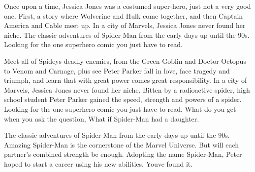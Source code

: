 Once upon a time, Jessica Jones was a costumed super-hero, just not a very good one. First, a story where Wolverine and Hulk come together, and then Captain America and Cable meet up. In a city of Marvels, Jessica Jones never found her niche. The classic adventures of Spider-Man from the early days up until the 90s. Looking for the one superhero comic you just have to read.

Meet all of Spideys deadly enemies, from the Green Goblin and Doctor Octopus to Venom and Carnage, plus see Peter Parker fall in love, face tragedy and triumph, and learn that with great power comes great responsibility. In a city of Marvels, Jessica Jones never found her niche. Bitten by a radioactive spider, high school student Peter Parker gained the speed, strength and powers of a spider. Looking for the one superhero comic you just have to read. What do you get when you ask the question, What if Spider-Man had a daughter.

The classic adventures of Spider-Man from the early days up until the 90s. Amazing Spider-Man is the cornerstone of the Marvel Universe. But will each partner’s combined strength be enough. Adopting the name Spider-Man, Peter hoped to start a career using his new abilities. Youve found it.

